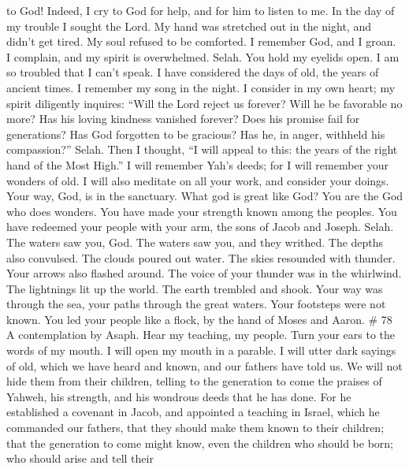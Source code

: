 to God! Indeed, I cry to God for help, and for him to listen to me.
 In the day of my trouble I sought the Lord. My hand was
stretched out in the night, and didn't get tired. My soul refused to be
comforted.  I remember God, and I groan. I complain, and my
spirit is overwhelmed. Selah.  You hold my eyelids open. I
am so troubled that I can't speak.  I have considered the
days of old, the years of ancient times.  I remember my song
in the night. I consider in my own heart; my spirit diligently inquires:
 ``Will the Lord reject us forever? Will he be favorable no
more?  Has his loving kindness vanished forever? Does his
promise fail for generations?  Has God forgotten to be
gracious? Has he, in anger, withheld his compassion?'' Selah.
 Then I thought, ``I will appeal to this: the years of the
right hand of the Most High.''  I will remember Yah's
deeds; for I will remember your wonders of old.  I will
also meditate on all your work, and consider your doings. 
Your way, God, is in the sanctuary. What god is great like God?
 You are the God who does wonders. You have made your
strength known among the peoples.  You have redeemed your
people with your arm, the sons of Jacob and Joseph. Selah. 
The waters saw you, God. The waters saw you, and they writhed. The
depths also convulsed.  The clouds poured out water. The
skies resounded with thunder. Your arrows also flashed around.
 The voice of your thunder was in the whirlwind. The
lightnings lit up the world. The earth trembled and shook. 
Your way was through the sea, your paths through the great waters. Your
footsteps were not known.  You led your people like a
flock, by the hand of Moses and Aaron. \# 78 A contemplation by Asaph.
 Hear my teaching, my people. Turn your ears to the words of
my mouth.  I will open my mouth in a parable. I will utter
dark sayings of old,  which we have heard and known, and our
fathers have told us.  We will not hide them from their
children, telling to the generation to come the praises of Yahweh, his
strength, and his wondrous deeds that he has done.  For he
established a covenant in Jacob, and appointed a teaching in Israel,
which he commanded our fathers, that they should make them known to
their children;  that the generation to come might know,
even the children who should be born; who should arise and tell their
